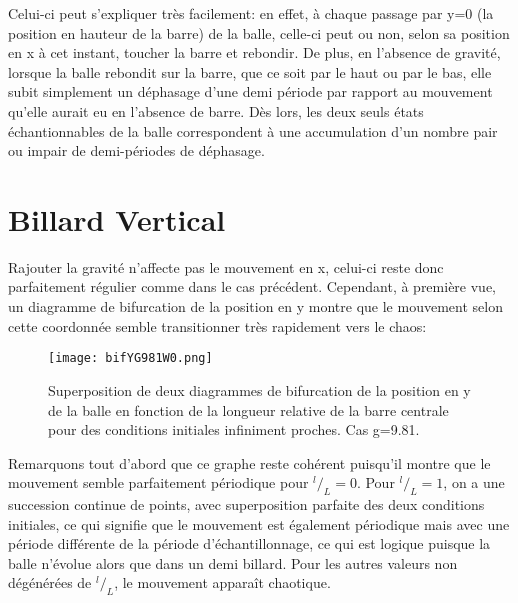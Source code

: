 \documentclass[a4paper]{report}
\begin{document}
Celui-ci peut s'expliquer très facilement: en effet, à chaque passage par y=0 (la position en hauteur de la barre) de la balle, celle-ci peut ou non, selon sa position en x à cet instant, toucher la barre et rebondir. De plus, en l'absence de gravité, lorsque la balle rebondit sur la barre, que ce soit par le haut ou par le bas, elle subit simplement un déphasage d'une demi période par rapport au mouvement qu'elle aurait eu en l'absence de barre. Dès lors, les deux seuls états échantionnables de la balle correspondent à une accumulation d'un nombre pair ou impair de demi-périodes de déphasage.

\section{Billard Vertical}
Rajouter la gravité n'affecte pas le mouvement en x, celui-ci reste donc parfaitement régulier comme dans le cas précédent. Cependant, à première vue, un diagramme de bifurcation de la position en y montre que le mouvement selon cette coordonnée semble transitionner très rapidement vers le chaos:
\begin{figure}[h]
   \texttt{[image: bifYG981W0.png]}
      \caption[Diagramme de Bifurcation en y: g=9.81 ]{Superposition de deux diagrammes de bifurcation de la position en y de la balle en fonction de la longueur relative de la barre centrale pour des conditions initiales infiniment proches. Cas g=9.81.}
\end{figure}
Remarquons tout d'abord que ce graphe reste cohérent puisqu'il montre que le mouvement semble parfaitement périodique pour \(^l/_L=0\). Pour \(^l/_L=1\), on a une succession continue de points, avec superposition parfaite des deux conditions initiales, ce qui signifie que le mouvement est également périodique mais avec une période différente de la période d'échantillonnage, ce qui est logique puisque la balle n'évolue alors que dans un demi billard. Pour les autres valeurs non dégénérées de \(^l/_L\), le mouvement apparaît chaotique.
\end{document}

